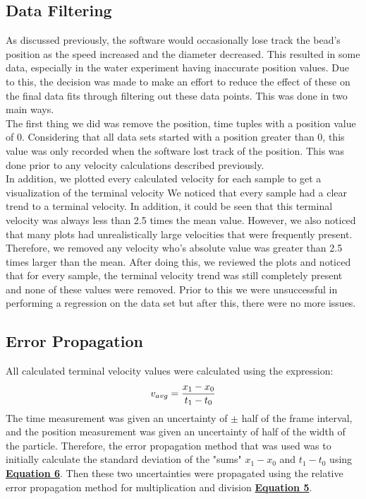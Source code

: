 \documentclass[
	letterpaper
	12pt
]{template}
\newcommand{\bref}[2]{\textbf{\hyperref[#1]{#2}}}
\begin{document}
\subsection{Data Filtering}\label{filtering}
As discussed previously, the software would occasionally lose track the bead's position as the speed increased and the diameter decreased. This resulted in some data, especially in the water experiment having inaccurate position values. Due to this, the decision was made to make an effort to reduce the effect of these on the final data fits through filtering out these data points. This was done in two main ways.\\

The first thing we did was remove the position, time tuples with a position value of $0$. Considering that all data sets started with a position greater than $0$, this value was only recorded when the software lost track of the position. This was done prior to any velocity calculations described previously.\\

In addition, we plotted every calculated velocity for each sample to get a visualization of the terminal velocity We noticed that every sample had a clear trend to a terminal velocity. In addition, it could be seen that this terminal velocity was always less than 2.5 times the mean value. However, we also noticed that many plots had unrealistically large velocities that were frequently present. Therefore, we removed any velocity who's absolute value was greater than 2.5 times larger than the mean. After doing this, we reviewed the plots and noticed that for every sample, the terminal velocity trend was still completely present and none of these values were removed. Prior to this we were unsuccessful in performing a regression on the data set but after this, there were no more issues.
\subsection{Error Propagation}
All calculated terminal velocity values were calculated using the expression:
\[v_{avg} = {x_1-x_0\over t_1-t_0}\]
The time measurement was given an uncertainty of $\pm$ half of the frame interval, and the position measurement was given an uncertainty of half of the width of the particle. Therefore, the error propagation method that was used was to initially calculate the standard deviation of the "sums" $x_1-x_0$ and $t_1-t_0$ using \bref{addErr}{Equation 6}. Then these two uncertainties were propagated using the relative error propagation method for multiplication and division \bref{relErr}{Equation 5}.
\end{document}
